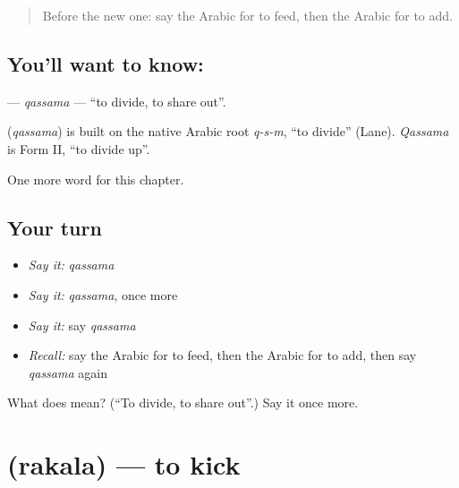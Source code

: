 \label{lesson:AR-C230-qassama}



\begin{quote}
Before the new one: say the Arabic for to feed, then the Arabic for to add.
\end{quote}

\subsection*{You'll want to know: }
\textbf{} — \emph{qassama} — \textquotedblleft{}to divide, to share out\textquotedblright{}.

\begin{cousinweb}
\textbf{} (\emph{qassama}) is built on the native Arabic root \emph{q-s-m}, \textquotedblleft{}to divide\textquotedblright{} (Lane). \emph{Qassama} is Form II, \textquotedblleft{}to divide up\textquotedblright{}.
\end{cousinweb}

\begin{grammarlens}[title={What you've built}]
One more word for this chapter.
\end{grammarlens}

\subsection*{Your turn}
\begin{itemize}
\raggedright
  \item \emph{Say it:} \emph{qassama}
  \item \emph{Say it:} \emph{qassama}, once more
  \item \emph{Say it:} say \emph{qassama}
  \item \emph{Recall:} say the Arabic for to feed, then the Arabic for to add, then say \emph{qassama} again
\end{itemize}

\begin{tcolorbox}[breakable,colback=teal!4,colframe=teal!35!black,title={Before you move on}]
What does  mean? (\textquotedblleft{}To divide, to share out\textquotedblright{}.) Say it once more.
\end{tcolorbox}
\section[\texorpdfstring{\ar{ركل} (rakala)}{ركل (rakala)}]{ (rakala) — to kick}

